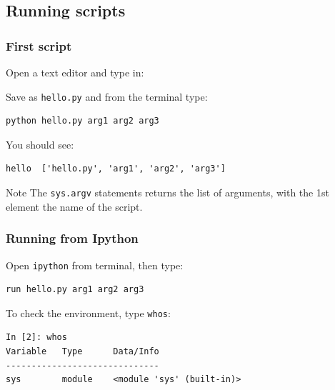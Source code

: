 \subsection{Running scripts}

\begin{frame}[fragile]
    \frametitle{First script}
    Open a text editor and type in:
    
    \vspace{1em}

Save as \verb+hello.py+ and from the terminal type:
    \begin{lstlisting}[language=bash, basicstyle=\ttfamily\scriptsize] 
python hello.py arg1 arg2 arg3
    \end{lstlisting}
    \vspace{0.5em}

You should see:
    \vspace{-0.5em}
    \begin{verbatim}
hello  ['hello.py', 'arg1', 'arg2', 'arg3']
    \end{verbatim}
    \vspace{-1.0em}
    \begin{block}{Note}
The \verb+sys.argv+ statements returns the list of arguments, with the 1st element the name of the script.
    \end{block}
\end{frame}

\begin{frame}[fragile]
    \frametitle{Running from Ipython}
    Open \verb+ipython+ from terminal, then type:
    \begin{lstlisting}[basicstyle=\ttfamily\scriptsize]
run hello.py arg1 arg2 arg3
    \end{lstlisting}
    \vspace{1em}
    To check the environment, type \verb+whos+: 
    \begin{lstlisting}[basicstyle=\ttfamily\scriptsize]
In [2]: whos
Variable   Type      Data/Info
------------------------------
sys        module    <module 'sys' (built-in)>
    \end{lstlisting}
\end{frame}

